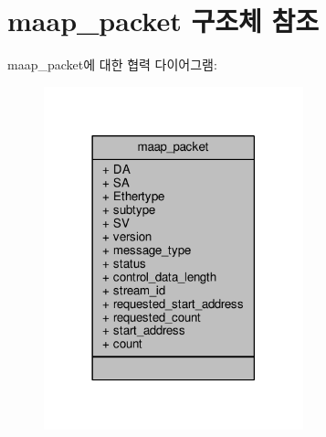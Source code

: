 \hypertarget{structmaap__packet}{}\section{maap\+\_\+packet 구조체 참조}
\label{structmaap__packet}


maap\+\_\+packet에 대한 협력 다이어그램\+:
\nopagebreak
\begin{figure}[H]
\begin{center}
\leavevmode
\includegraphics[width=213pt]{structmaap__packet__coll__graph}
\end{center}
\end{figure}
